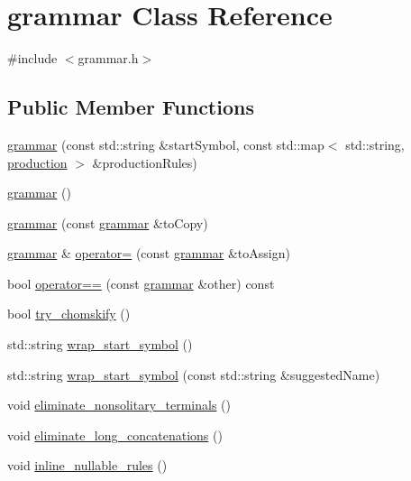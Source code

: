 \hypertarget{classgrammar}{}\section{grammar Class Reference}
\label{classgrammar}


{\ttfamily \#include $<$grammar.\+h$>$}

\subsection*{Public Member Functions}
\begin{DoxyCompactItemize}
\item 
\mbox{\hyperlink{classgrammar_ac5f3203b55ddacb4be6812e28bc24c54}{grammar}} (const std\+::string \&start\+Symbol, const std\+::map$<$ std\+::string, \mbox{\hyperlink{classproduction}{production}} $>$ \&production\+Rules)
\item 
\mbox{\hyperlink{classgrammar_a938b62e11d5b77d1d1345a09bdf0c53a}{grammar}} ()
\item 
\mbox{\hyperlink{classgrammar_af510455ef0446c923c2e263d09860106}{grammar}} (const \mbox{\hyperlink{classgrammar}{grammar}} \&to\+Copy)
\item 
\mbox{\hyperlink{classgrammar}{grammar}} \& \mbox{\hyperlink{classgrammar_a3db2c51b19a84c1ce87c3c51dc2920a4}{operator=}} (const \mbox{\hyperlink{classgrammar}{grammar}} \&to\+Assign)
\item 
bool \mbox{\hyperlink{classgrammar_a100c981be6ba64d3dbf00b3a0b5f9625}{operator==}} (const \mbox{\hyperlink{classgrammar}{grammar}} \&other) const
\item 
bool \mbox{\hyperlink{classgrammar_a9b20c1a787aa628df4424651c4e7785e}{try\+\_\+chomskify}} ()
\item 
std\+::string \mbox{\hyperlink{classgrammar_a3c92b694459fcff389cadb9c08c60154}{wrap\+\_\+start\+\_\+symbol}} ()
\item 
std\+::string \mbox{\hyperlink{classgrammar_a151e599b2202fe4cb3beee2f8807c3fd}{wrap\+\_\+start\+\_\+symbol}} (const std\+::string \&suggested\+Name)
\item 
void \mbox{\hyperlink{classgrammar_a33362bc642781e3f92193239a8a68754}{eliminate\+\_\+nonsolitary\+\_\+terminals}} ()
\item 
void \mbox{\hyperlink{classgrammar_a952140b5dc622de9d076323c340b23f9}{eliminate\+\_\+long\+\_\+concatenations}} ()
\item 
void \mbox{\hyperlink{classgrammar_ab1161361d2865e305c3c40d1f8de6a6b}{inline\+\_\+nullable\+\_\+rules}} ()

\end{DoxyCompactItemize}
